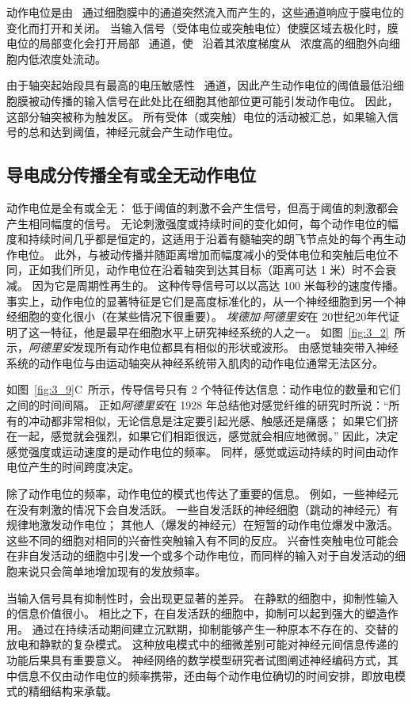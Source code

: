 动作电位是由~ 通过细胞膜中的通道突然流入而产生的，这些通道响应于膜电位的变化而打开和关闭。
当输入信号（受体电位或突触电位）使膜区域去极化时，膜电位的局部变化会打开局部~ 通道，使~ 沿着其浓度梯度从~ 浓度高的细胞外向细胞内低浓度处流动。


由于轴突起始段具有最高的电压敏感性~ 通道，因此产生动作电位的阈值最低沿细胞膜被动传播的输入信号在此处比在细胞其他部位更可能引发动作电位。
因此，这部分轴突被称为触发区。
所有受体（或突触）电位的活动被汇总，如果输入信号的总和达到阈值，神经元就会产生动作电位。


\subsection{导电成分传播全有或全无动作电位}
动作电位是全有或全无：
低于阈值的刺激不会产生信号，但高于阈值的刺激都会产生相同幅度的信号。
无论刺激强度或持续时间的变化如何，每个动作电位的幅度和持续时间几乎都是恒定的，这适用于沿着有髓轴突的朗飞节点处的每个再生动作电位。
此外，与被动传播并随距离增加而幅度减小的受体电位和突触后电位不同，正如我们所见，动作电位在沿着轴突到达其目标（距离可达 1 米）时不会衰减。 
因为它是周期性再生的。
这种传导信号可以以高达 100 米每秒的速度传播。
事实上，动作电位的显著特征是它们是高度标准化的，从一个神经细胞到另一个神经细胞的变化很小（在某些情况下很重要）。
\textit{埃德加$\cdot$阿德里安}在 20世纪20年代证明了这一特征，他是最早在细胞水平上研究神经系统的人之一。
如图~\ref{fig:3_2}~所示，\textit{阿德里安}发现所有动作电位都具有相似的形状或波形。
由感觉轴突带入神经系统的动作电位与由运动轴突从神经系统带入肌肉的动作电位通常无法区分。


如图~\ref{fig:3_9}C~所示，传导信号只有 2 个特征传达信息：动作电位的数量和它们之间的时间间隔。
正如\textit{阿德里安}在 1928 年总结他对感觉纤维的研究时所说：“所有的冲动都非常相似，无论信息是注定要引起光感、触感还是痛感；
如果它们挤在一起，感觉就会强烈，如果它们相距很远，感觉就会相应地微弱。” 
因此，决定感觉强度或运动速度的是动作电位的频率。
同样，感觉或运动持续的时间由动作电位产生的时间跨度决定。


除了动作电位的频率，动作电位的模式也传达了重要的信息。
例如，一些神经元在没有刺激的情况下会自发活跃。
一些自发活跃的神经细胞（跳动的神经元）有规律地激发动作电位；
其他人（爆发的神经元）在短暂的动作电位爆发中激活。
这些不同的细胞对相同的兴奋性突触输入有不同的反应。
兴奋性突触电位可能会在非自发活动的细胞中引发一个或多个动作电位，而同样的输入对于自发活动的细胞来说只会简单地增加现有的发放频率。


当输入信号具有抑制性时，会出现更显著的差异。
在静默的细胞中，抑制性输入的信息价值很小。 
相比之下，在自发活跃的细胞中，抑制可以起到强大的塑造作用。
通过在持续活动期间建立沉默期，抑制能够产生一种原本不存在的、交替的放电和静默的复杂模式。
这种放电模式中的细微差别可能对神经元间信息传递的功能后果具有重要意义。
神经网络的数学模型研究者试图阐述神经编码方式，其中信息不仅由动作电位的频率携带，还由每个动作电位确切的时间安排，即放电模式的精细结构来承载。


